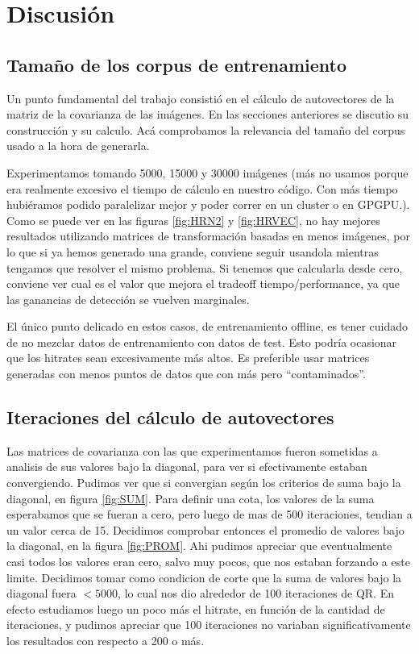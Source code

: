 \section{Discusi\'on}

\subsection{Tama\~no de los corpus de entrenamiento }
Un punto fundamental del trabajo consisti\'o en el c\'alculo de autovectores de la matriz
de la covarianza de las im\'agenes. En las secciones anteriores se discutio su construcci\'on
y su calculo. Ac\'a comprobamos la relevancia del tama\~no del corpus usado a la hora
de generarla.

Experimentamos tomando 5000, 15000 y 30000 im\'agenes (m\'as no usamos porque era
realmente excesivo el tiempo de c\'alculo en nuestro c\'odigo. Con m\'as tiempo hubi\'eramos podido paralelizar mejor
y poder correr en un cluster o en GPGPU.). 
Como se puede ver en las figuras \ref{fig:HRN2} y \ref{fig:HRVEC},
no hay mejores resultados utilizando matrices de transformaci\'on basadas en menos im\'agenes, por lo que
si ya hemos generado una grande, conviene seguir usandola mientras tengamos que resolver
el mismo problema. Si tenemos que calcularla desde cero, conviene ver cual es el valor que mejora
el tradeoff tiempo/performance, ya que las ganancias de detecci\'on se vuelven marginales.

El \'unico punto delicado en estos casos, de entrenamiento offline, es tener cuidado
de no mezclar datos de entrenamiento con datos de test. Esto podr\'ia ocasionar que
los hitrates sean excesivamente m\'as altos. Es preferible usar matrices generadas
con menos puntos de datos que con m\'as pero ``contaminados''.


\subsection{Iteraciones del c\'alculo de autovectores}
Las matrices de covarianza con las que experimentamos fueron sometidas a
analisis de sus valores bajo la diagonal, para ver si efectivamente estaban
convergiendo. Pudimos ver que si convergian seg\'un
los criterios de suma bajo la diagonal, en figura \ref{fig:SUM}. Para definir
una cota, los valores de la suma esperabamos que se fueran a cero, pero
luego de mas de 500 iteraciones, tendian a un valor cerca de 15. Decidimos
comprobar entonces el promedio de valores bajo la diagonal, en la figura \ref{fig:PROM}.
Ahi pudimos apreciar que eventualmente casi todos los valores eran cero, salvo muy pocos,
que nos estaban forzando a este limite. Decidimos tomar como condicion de corte
que la suma de valores bajo la diagonal fuera $<5000$, lo cual nos dio
alrededor de 100 iteraciones de QR. En efecto estudiamos luego un poco m\'as 
el hitrate, en funci\'on de la cantidad de iteraciones, y pudimos apreciar que
100 iteraciones no variaban significativamente los resultados con respecto a 200 o m\'as.

